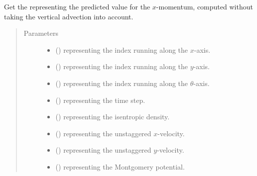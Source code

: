 \documentclass[letterpaper,10pt,english]{sphinxmanual}
\begin{document}
\begin{fulllineitems}
\begin{fulllineitems}
\label{\detokenize{api:dycore.flux_isentropic_maccormack.FluxIsentropicMacCormack._get_maccormack_horizontal_predicted_value_U}}
Get the  representing the predicted value for the \(x\)-momentum,
computed without taking the vertical advection into account.
\begin{quote}\begin{description}
\item[{Parameters}] \leavevmode\begin{itemize}
\item {} 
 () \textendash{}  representing the index running along the \(x\)-axis.

\item {} 
 () \textendash{}  representing the index running along the \(y\)-axis.

\item {} 
 () \textendash{}  representing the index running along the \(\theta\)-axis.

\item {} 
 () \textendash{}  representing the time step.

\item {} 
 () \textendash{}  representing the isentropic density.

\item {} 
 () \textendash{}  representing the unstaggered \(x\)-velocity.

\item {} 
 () \textendash{}  representing the unstaggered \(y\)-velocity.

\item {} 
 () \textendash{}  representing the Montgomery potential.


\end{itemize}
\end{description}
\end{quote}
\end{fulllineitems}
\end{fulllineitems}
\end{document}
